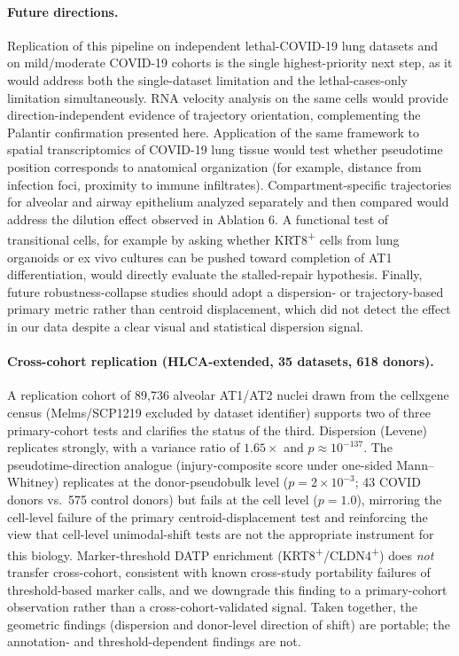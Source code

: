 \documentclass[11pt]{article}
\begin{document}
\paragraph{Future directions.} Replication of this pipeline on independent lethal-COVID-19 lung datasets and on mild/moderate COVID-19 cohorts is the single highest-priority next step, as it would address both the single-dataset limitation and the lethal-cases-only limitation simultaneously. RNA velocity analysis \citep{LaManno2018, Bergen2020} on the same cells would provide direction-independent evidence of trajectory orientation, complementing the Palantir confirmation presented here. Application of the same framework to spatial transcriptomics of COVID-19 lung tissue would test whether pseudotime position corresponds to anatomical organization (for example, distance from infection foci, proximity to immune infiltrates). Compartment-specific trajectories for alveolar and airway epithelium analyzed separately and then compared would address the dilution effect observed in Ablation 6. A functional test of transitional cells, for example by asking whether KRT8\textsuperscript{+} cells from lung organoids or ex vivo cultures can be pushed toward completion of AT1 differentiation, would directly evaluate the stalled-repair hypothesis. Finally, future robustness-collapse studies should adopt a dispersion- or trajectory-based primary metric rather than centroid displacement, which did not detect the effect in our data despite a clear visual and statistical dispersion signal.

\paragraph{Cross-cohort replication (HLCA-extended, 35 datasets, 618 donors).} A replication cohort of 89{,}736 alveolar AT1/AT2 nuclei drawn from the cellxgene census (Melms/SCP1219 excluded by dataset identifier) supports two of three primary-cohort tests and clarifies the status of the third. Dispersion (Levene) replicates strongly, with a variance ratio of $1.65\times$ and $p \approx 10^{-137}$. The pseudotime-direction analogue (injury-composite score under one-sided Mann--Whitney) replicates at the donor-pseudobulk level ($p = 2 \times 10^{-3}$; 43 COVID donors vs.\ 575 control donors) but fails at the cell level ($p = 1.0$), mirroring the cell-level failure of the primary centroid-displacement test and reinforcing the view that cell-level unimodal-shift tests are not the appropriate instrument for this biology. Marker-threshold DATP enrichment (KRT8\textsuperscript{+}/CLDN4\textsuperscript{+}) does \emph{not} transfer cross-cohort, consistent with known cross-study portability failures of threshold-based marker calls, and we downgrade this finding to a primary-cohort observation rather than a cross-cohort-validated signal. Taken together, the geometric findings (dispersion and donor-level direction of shift) are portable; the annotation- and threshold-dependent findings are not.
\end{document}

